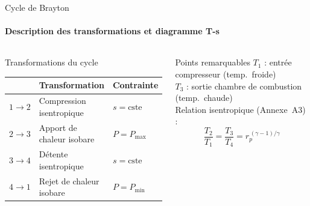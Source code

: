 \documentclass[aspectratio=43, 10pt]{beamer}
\begin{document}
\begin{frame}{Cycle de Brayton }
  \framesubtitle{Description des transformations et diagramme T-s}

  \begin{columns}[T,onlytextwidth]
      \begin{block}{Transformations du cycle}
        \scriptsize
        \renewcommand{\arraystretch}{1.2}
        \begin{tabular}{@{}cll@{}}
          \toprule
          & Transformation & Contrainte \\
          \midrule
          $1\!\to\!2$ & Compression isentropique  & $s = \text{cste}$ \\
          $2\!\to\!3$ & Apport de chaleur isobare & $P = P_{\max}$ \\
          $3\!\to\!4$ & D\'etente isentropique     & $s = \text{cste}$ \\
          $4\!\to\!1$ & Rejet de chaleur isobare  & $P = P_{\min}$ \\
          \bottomrule
        \end{tabular}
      \end{block}

      \vspace{0.15em}
      \begin{exampleblock}{Points remarquables}
        \small
        $T_1$ : entr\'ee compresseur (temp.\ froide)\\[3pt]
        $T_3$ : sortie chambre de combustion (temp.\ chaude)\\[4pt]
        Relation isentropique (Annexe~A3) :\\[4pt]
        \[
          \frac{T_2}{T_1} = \frac{T_3}{T_4}
          = r_p^{\,(\gamma-1)/\gamma}
        \]
      \end{exampleblock}


\end{columns}
\end{frame}
\end{document}
